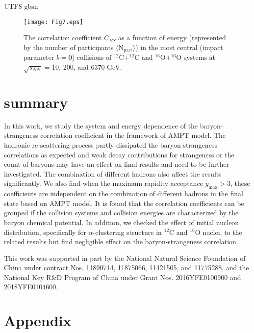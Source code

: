 \documentclass[twocolumn,showpacs,preprintnumbers,amsmath,amssymb]{revtex4-1}
\begin{document}
\begin{CJK*} {UTF8} {gbsn}
	
		\begin{figure}[htb]
		\texttt{[image: Fig7.eps]}
					\caption{The correlation coefficient $C_{BS}$ as a function of energy (represented by the number of participants $\langle \mathrm{N_{part}}\rangle$) 
				in the most central (impact parameter $b=0$) collisions of $\mathrm{^{12}C+^{12}C}$ and $\mathrm{^{16}O + ^{16}O}$ systems at $\sqrt{s_{NN}}$ = 10, 200, and 6370 GeV.}
				\label{Fig7}
	\end{figure}

	
\section{summary}
\label{sec:summary}	


In this work, we study the system and energy dependence of the baryon-strangeness correlation coefficient in the framework of AMPT model. 
The hadronic re-scattering process partly dissipated the baryon-strangeness correlations as expected and weak decay contributions for strangeness or the count of baryons may have an effect on final results and need to be further investigated.
The combination of different hadrons also affect the results significantly. We also find when the maximum rapidity acceptance $y_{\text{max}}>3$, these coefficients are independent on the combination of different hadrons in the final state based on AMPT model. It is found that the correlation coefficients can be grouped if the collision systems and collision energies are characterized by the baryon chemical potential.
 In addition, we checked the effect of initial nucleon distribution, specifically for $\alpha$-clustering structure in $^{12}$C and $^{16}$O nuclei, to the related results but find negligible effect on the baryon-strangeness correlation.


		\begin{acknowledgements}
	
This work was supported in part by the National Natural Science Foundation of China under contract Nos. 11890714, 11875066, 11421505, and 11775288, and the National Key R\&D Program of China under Grant Nos. 2016YFE0100900 and 2018YFE0104600.

	\end{acknowledgements}
	
	
	
	\section{Appendix}
		  \begin{appendices} 

\end{appendices}
\end{CJK*}
\end{document}
